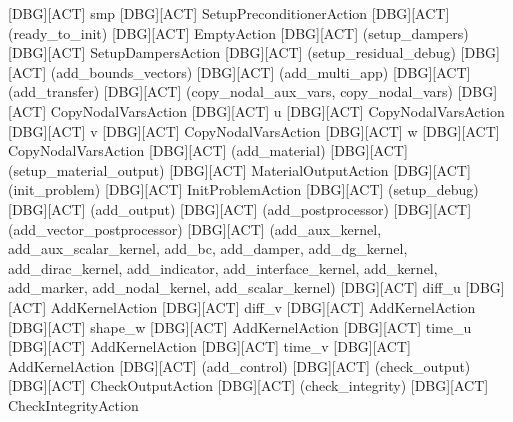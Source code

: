 {[DBG][ACT]	smp
[DBG][ACT]	SetupPreconditionerAction
[DBG][ACT] (ready_to_init)
[DBG][ACT]	EmptyAction
[DBG][ACT] (setup_dampers)
[DBG][ACT]	SetupDampersAction
[DBG][ACT] (setup_residual_debug)
[DBG][ACT] (add_bounds_vectors)
[DBG][ACT] (add_multi_app)
[DBG][ACT] (add_transfer)
[DBG][ACT] (copy_nodal_aux_vars, copy_nodal_vars)
[DBG][ACT]	CopyNodalVarsAction
[DBG][ACT]	u
[DBG][ACT]	CopyNodalVarsAction
[DBG][ACT]	v
[DBG][ACT]	CopyNodalVarsAction
[DBG][ACT]	w
[DBG][ACT]	CopyNodalVarsAction
[DBG][ACT] (add_material)
[DBG][ACT] (setup_material_output)
[DBG][ACT]	MaterialOutputAction
[DBG][ACT] (init_problem)
[DBG][ACT]	InitProblemAction
[DBG][ACT] (setup_debug)
[DBG][ACT] (add_output)
[DBG][ACT] (add_postprocessor)
[DBG][ACT] (add_vector_postprocessor)
[DBG][ACT] (add_aux_kernel, add_aux_scalar_kernel, add_bc, add_damper, add_dg_kernel, add_dirac_kernel, add_indicator, add_interface_kernel, add_kernel, add_marker, add_nodal_kernel, add_scalar_kernel)
[DBG][ACT]	diff_u
[DBG][ACT]	AddKernelAction
[DBG][ACT]	diff_v
[DBG][ACT]	AddKernelAction
[DBG][ACT]	shape_w
[DBG][ACT]	AddKernelAction
[DBG][ACT]	time_u
[DBG][ACT]	AddKernelAction
[DBG][ACT]	time_v
[DBG][ACT]	AddKernelAction
[DBG][ACT] (add_control)
[DBG][ACT] (check_output)
[DBG][ACT]	CheckOutputAction
[DBG][ACT] (check_integrity)
[DBG][ACT]	CheckIntegrityAction


}
